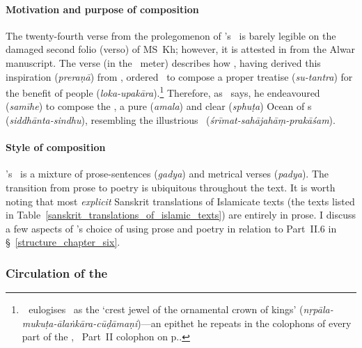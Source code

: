 \paragraph{Motivation and purpose of composition}\label{motivation_purpose_of_siddhantasindhu} 
The twenty-fourth verse from the prolegomenon of \Nityananda's \Siddhantasindhu\ is barely legible on the damaged second folio (verso) of MS~Kh; however, it is attested in \textcite[231]{PetersonCatalogue} from the Alwar manuscript. The verse (in the \sardulavikridita\ meter) describes how \AsafKhanshort, having derived this inspiration (\textit{preraṇā}) from \Shahjahan, ordered \Nityananda\ to compose a proper treatise (\textit{su-tantra}) for the benefit of people (\textit{loka-upakāra}).\footnote{\,\Nityananda\ eulogises \Shahjahan\ as the `crest jewel of the ornamental crown of kings' (\textit{nṛpāla-mukuṭa-ālaṅkāra-cūḍāmaṇi})---an epithet he repeats in the colophons of every part of the \Siddhantasindhu, \eg \vid\ Part~II colophon on p.\thinspace \pageref{partII_colophon_sanskrit}.} Therefore, as \Nityananda\ says, he endeavoured (\textit{samīhe}) to compose the \Siddhantasindhu, a pure (\textit{amala}) and clear (\textit{sphuṭa}) Ocean of \Siddhanta s (\textit{siddhānta-sindhu}), resembling the illustrious \ZijiShahJahani\ (\textit{śrīmat-sahājahāṃ-prakāśam}). 


\paragraph{Style of composition} \label{prose_poetry_mixed_form}   
\Nityananda's \Siddhantasindhu\ is a mixture of prose-sentences (\textit{gadya}) and metrical verses (\textit{padya}). The transition from prose to poetry is ubiquitous throughout the text. It is worth noting that most \textit{explicit} Sanskrit translations of Islamicate texts (\eg the texts listed in Table~\ref{sanskrit_translations_of_islamic_texts}) are entirely in prose. I discuss a few aspects of \Nityananda's choice of using prose and poetry in relation to Part~II.6 in \S~\ref{structure_chapter_six}.
    
\subsubsection{Circulation of the \Siddhantasindhu} \label{circualtion_siddhantasindhu}

